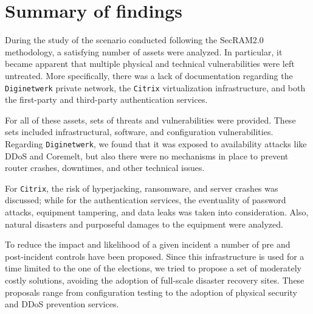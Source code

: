 \chapter*{Summary of findings}

During the study of the scenario conducted following the SecRAM2.0 methodology\cite{article:SecRAM}, a satisfying number of assets were analyzed. In particular, it became apparent that multiple physical and technical vulnerabilities were left untreated.
More specifically, there was a lack of documentation regarding the \texttt{Diginetwerk} private network, the \texttt{Citrix} virtualization infrastructure, and both the first-party and third-party authentication services. 

For all of these assets, sets of threats and vulnerabilities were provided. These sets included infrastructural, software, and configuration vulnerabilities.
Regarding \texttt{Diginetwerk}, we found that it was exposed to availability attacks like DDoS and Coremelt, but also there were no mechanisms in place to prevent router crashes, downtimes, and other technical issues.

For \texttt{Citrix}, the risk of hyperjacking, ransomware, and server crashes was discussed; while for the authentication services, the eventuality of password attacks, equipment tampering, and data leaks was taken into consideration.
Also, natural disasters and purposeful damages to the equipment were analyzed.

To reduce the impact and likelihood of a given incident a number of pre and post-incident controls have been proposed. Since this infrastructure is used for a time limited to the one of the elections, we tried to propose a set of moderately costly solutions, avoiding the adoption of full-scale disaster recovery sites. These proposals range from configuration testing to the adoption of physical security and DDoS prevention services.



